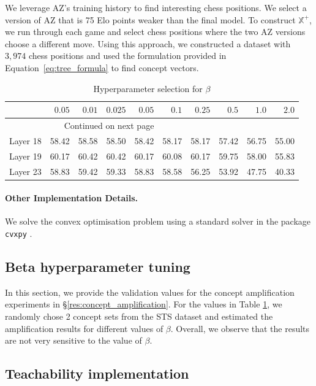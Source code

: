\documentclass{article}
\def\Xset{\mathbb{X}}
\begin{document}
We leverage AZ's training history to find interesting chess positions. We select a version of AZ that is 75 Elo points weaker than the final model.
To construct $\Xset^{+}$, we run through each game and select chess positions where the two AZ versions choose a different move. 
Using this approach, we constructed a dataset with $3,974$ chess positions and used the formulation provided in Equation~\ref{eq:tree_formula} to find concept vectors.

\begin{longtable}{lrrrrrrrrr}
\caption{Hyperparameter selection for $\beta$}
\label{table:beta_hypertuning} \\ 
\toprule
  &  $0.05$ & $0.01$ & $0.025$ & $0.05$ & $0.1$ & $0.25$  & $0.5$ & $1.0$ & $2.0$ \\ 
\midrule
\endhead
\midrule
\multicolumn{5}{r}{{Continued on next page}} \\
\midrule
\endfoot
\bottomrule
\endlastfoot
Layer 18 & 58.42 & 58.58 & 58.50 & 58.42 & 58.17 & 58.17 & 57.42 & 56.75 & 55.00 \\ 
Layer 19 & 60.17 & 60.42 & 60.42 & 60.17 & 60.08 & 60.17 & 59.75 & 58.00 & 55.83 \\
Layer 23 & 58.83 & 59.42 & 59.33 & 58.83 & 58.58 & 56.25 & 53.92 & 47.75 & 40.33\\ 
\end{longtable}

\paragraph{Other Implementation Details.}
We solve the convex optimisation problem using a standard solver in the package \texttt{cvxpy} \citep{cvxpy1, cvxpy2}.

\subsection{Beta hyperparameter tuning} \label{appx:beta}
In this section, we provide the validation values for the concept amplification experiments in \S\ref{res:concept_amplification}.
For the values in Table \ref{table:beta_hypertuning}, we randomly chose 2 concept sets from the STS dataset and estimated the amplification results for different values of $\beta$.
Overall, we observe that the results are not very sensitive to the value of $\beta$. 

\subsection{Teachability implementation} \label{appx:teachability}
\end{document}
